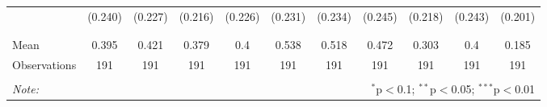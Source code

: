 \begin{tabular}{@{\extracolsep{5pt}}lcccccccccc}
  & (0.240) & (0.227) & (0.216) & (0.226) & (0.231) & (0.234) & (0.245) & (0.218) & (0.243) & (0.201) \\ 
  & & & & & & & & & & \\ 
\hline \\[-1.8ex] 
Mean & 0.395 & 0.421 & 0.379 & 0.4 & 0.538 & 0.518 & 0.472 & 0.303 & 0.4 & 0.185 \\ 
Observations & 191 & 191 & 191 & 191 & 191 & 191 & 191 & 191 & 191 & 191 \\ 
\hline 
\hline \\[-1.8ex] 
\textit{Note:}  & \multicolumn{10}{r}{$^{*}$p$<$0.1; $^{**}$p$<$0.05; $^{***}$p$<$0.01} \\ 
\end{tabular} 
